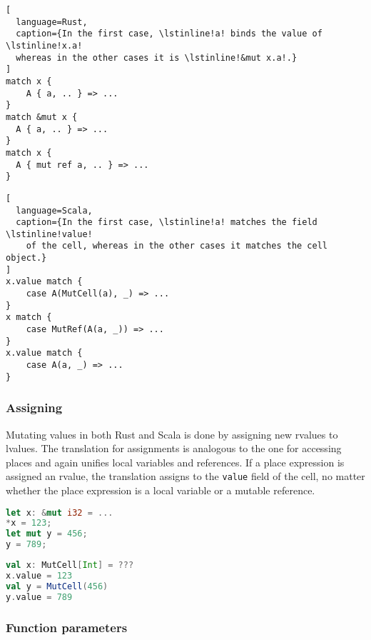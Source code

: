 \noindent\begin{minipage}[t]{.45\textwidth}
\begin{lstlisting}[
  language=Rust,
  caption={In the first case, \lstinline!a! binds the value of \lstinline!x.a!
  whereas in the other cases it is \lstinline!&mut x.a!.}
]
match x {
    A { a, .. } => ...
}
match &mut x {
  A { a, .. } => ...
}
match x {
  A { mut ref a, .. } => ...
}
\end{lstlisting}
\end{minipage}\hfill
\begin{minipage}[t]{.45\textwidth}
\begin{lstlisting}[
  language=Scala,
  caption={In the first case, \lstinline!a! matches the field \lstinline!value!
    of the cell, whereas in the other cases it matches the cell object.}
]
x.value match {
    case A(MutCell(a), _) => ...
}
x match {
    case MutRef(A(a, _)) => ...
}
x.value match {
    case A(a, _) => ...
}
\end{lstlisting}
\end{minipage}

\subsubsection{Assigning}

Mutating values in both Rust and Scala is done by assigning new rvalues
to lvalues. The translation for assignments is analogous to the one for
accessing places and again unifies local variables and references. If a
place expression is assigned an rvalue, the translation assigns to the
\passthrough{\lstinline!value!} field of the cell, no matter whether the
place expression is a local variable or a mutable reference.

\noindent\begin{minipage}[t]{.45\textwidth}
\begin{lstlisting}[language=Rust]
let x: &mut i32 = ...
*x = 123;
let mut y = 456;
y = 789;
\end{lstlisting}
\end{minipage}\hfill
\begin{minipage}[t]{.45\textwidth}
\begin{lstlisting}[language=Scala]
val x: MutCell[Int] = ???
x.value = 123
val y = MutCell(456)
y.value = 789
\end{lstlisting}
\end{minipage}

\subsubsection{Function parameters}

